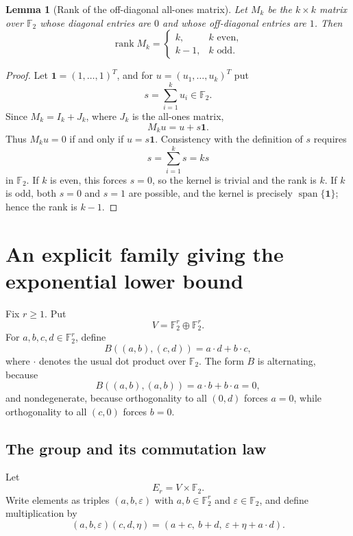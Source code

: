 \documentclass[11pt]{article}
\newtheorem{lemma}[theorem]{Lemma}
\theoremstyle{definition}
\newcommand{\F}{\mathbb{F}}
\newcommand{\Span}{\operatorname{span}}
\newcommand{\rank}{\operatorname{rank}}
\begin{document}
\begin{lemma}[Rank of the off-diagonal all-ones matrix]\label{lem:matrix-rank}
Let $M_k$ be the $k\times k$ matrix over $\F_2$ whose diagonal entries are $0$ and whose off-diagonal entries are $1$.  Then
\[
 \rank M_k=
 \begin{cases}
 k,&k\text{ even},\\
 k-1,&k\text{ odd}.
 \end{cases}
\]
\end{lemma}

\begin{proof}
Let $\mathbf{1}=(1,\dots,1)^T$, and for $u=(u_1,\dots,u_k)^T$ put
\[
 s=\sum_{i=1}^k u_i\in\F_2.
\]
Since $M_k=I_k+J_k$, where $J_k$ is the all-ones matrix,
\[
 M_ku=u+s\mathbf{1}.
\]
Thus $M_ku=0$ if and only if $u=s\mathbf{1}$.  Consistency with the definition of $s$ requires
\[
 s=\sum_{i=1}^k s=ks
\]
in $\F_2$.  If $k$ is even, this forces $s=0$, so the kernel is trivial and the rank is $k$.  If $k$ is odd, both $s=0$ and $s=1$ are possible, and the kernel is precisely $\Span\{\mathbf{1}\}$; hence the rank is $k-1$.
\end{proof}

\section{An explicit family giving the exponential lower bound}

Fix $r\ge1$.  Put
\[
 V=\F_2^r\oplus\F_2^r.
\]
For $a,b,c,d\in\F_2^r$, define
\begin{equation}\label{eq:standard-symplectic-form}
 B((a,b),(c,d))=a\cdot d+b\cdot c,
\end{equation}
where $\cdot$ denotes the usual dot product over $\F_2$.
The form $B$ is alternating, because
\[
 B((a,b),(a,b))=a\cdot b+b\cdot a=0,
\]
and nondegenerate, because orthogonality to all $(0,d)$ forces $a=0$, while orthogonality to all $(c,0)$ forces $b=0$.

\subsection{The group and its commutation law}

Let
\[
 E_r=V\times\F_2.
\]
Write elements as triples $(a,b,\varepsilon)$ with $a,b\in\F_2^r$ and $\varepsilon\in\F_2$, and define multiplication by
\begin{equation}\label{eq:Er-multiplication}
 (a,b,\varepsilon)(c,d,\eta)
 =
 (a+c,\ b+d,\ \varepsilon+\eta+a\cdot d).
\end{equation}
\end{document}
